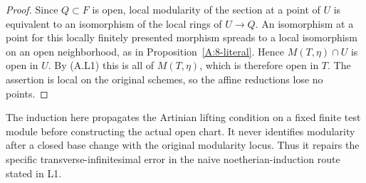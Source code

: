 \begin{proof}
Since $Q\subset F$ is open, local modularity of the section
at a point of $U$ is equivalent to an isomorphism of the local
rings of $U\to Q$.  An isomorphism at a point for this
locally finitely presented morphism spreads to a local
isomorphism on an open neighborhood, as in
Proposition~\ref{A:8-literal}.  Hence $M(T,\eta)\cap U$ is
open in $U$.  By (A.L1) this is all of $M(T,\eta)$, which
is therefore open in $T$.  The assertion is local on the
original schemes, so the affine reductions lose no points.
\end{proof}

The induction here propagates the Artinian lifting condition
on a fixed finite test module before constructing the actual
open chart.  It never identifies modularity after a closed
base change with the original modularity locus.  Thus it
repairs the specific transverse-infinitesimal error in the
naive noetherian-induction route stated in L1.
